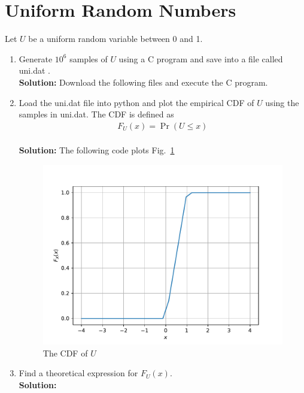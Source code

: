 \documentclass[12pt]{book}
\newcommand\figref{Fig.~\ref}
\providecommand{\pr}[1]{\ensuremath{\Pr\left(#1\right)}}
\newcommand{\solution}{\noindent \textbf{Solution: }}
\begin{document}
\section{Uniform Random Numbers}
Let $U$ be a uniform random variable between 0 and 1.
\begin{enumerate}
\item Generate $10^6$ samples of $U$ using a C program and save into a file called uni.dat .
\label{prob:uni_gen}
\\
\solution Download the following files and execute the  C program.
\begin{center}
\end{center}
\item
Load the uni.dat file into python and plot the empirical CDF of $U$ using the samples in uni.dat. The CDF is defined as
\begin{align}
F_{U}(x) = \pr{U \le x}
\end{align}
\\
\solution  The following code plots \figref{fig:uni_cdf}
\begin{center}
\end{center}
\begin{figure}[H]
\centering
\includegraphics[width=\columnwidth]{./figs/2/2.1.2.pdf}
\caption{The CDF of $U$}
\label{fig:uni_cdf}
\end{figure}
\item
Find a  theoretical expression for $F_{U}(x)$.\\
\solution


\end{enumerate}
\end{document}
